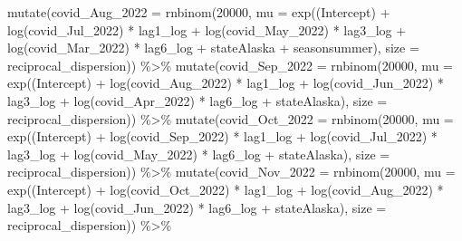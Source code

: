 \documentclass[
]{book}
\newenvironment{Shaded}{\begin{snugshade}}{\end{snugshade}}
\newcommand{\AttributeTok}[1]{\textcolor[rgb]{0.77,0.63,0.00}{#1}}
\newcommand{\DecValTok}[1]{\textcolor[rgb]{0.00,0.00,0.81}{#1}}
\newcommand{\FunctionTok}[1]{\textcolor[rgb]{0.00,0.00,0.00}{#1}}
\newcommand{\NormalTok}[1]{#1}
\newcommand{\SpecialCharTok}[1]{\textcolor[rgb]{0.00,0.00,0.00}{#1}}
\newcommand{\StringTok}[1]{\textcolor[rgb]{0.31,0.60,0.02}{#1}}
\begin{document}
\begin{Shaded}
\begin{Highlighting}[]
  \FunctionTok{mutate}\NormalTok{(}\AttributeTok{covid\_Aug\_2022 =} \FunctionTok{rnbinom}\NormalTok{(}\DecValTok{20000}\NormalTok{, }\AttributeTok{mu =} \FunctionTok{exp}\NormalTok{(}\StringTok{\textasciigrave{}}\AttributeTok{(Intercept)}\StringTok{\textasciigrave{}} \SpecialCharTok{+} \FunctionTok{log}\NormalTok{(covid\_Jul\_2022) }\SpecialCharTok{*}\NormalTok{ lag1\_log }\SpecialCharTok{+} \FunctionTok{log}\NormalTok{(covid\_May\_2022) }\SpecialCharTok{*}\NormalTok{ lag3\_log }\SpecialCharTok{+} \FunctionTok{log}\NormalTok{(covid\_Mar\_2022) }\SpecialCharTok{*}\NormalTok{ lag6\_log }\SpecialCharTok{+}\NormalTok{ stateAlaska }\SpecialCharTok{+}\NormalTok{ seasonsummer), }\AttributeTok{size =}\NormalTok{ reciprocal\_dispersion))  }\SpecialCharTok{\%\textgreater{}\%}
  \FunctionTok{mutate}\NormalTok{(}\AttributeTok{covid\_Sep\_2022 =} \FunctionTok{rnbinom}\NormalTok{(}\DecValTok{20000}\NormalTok{, }\AttributeTok{mu =} \FunctionTok{exp}\NormalTok{(}\StringTok{\textasciigrave{}}\AttributeTok{(Intercept)}\StringTok{\textasciigrave{}} \SpecialCharTok{+} \FunctionTok{log}\NormalTok{(covid\_Aug\_2022) }\SpecialCharTok{*}\NormalTok{ lag1\_log }\SpecialCharTok{+} \FunctionTok{log}\NormalTok{(covid\_Jun\_2022) }\SpecialCharTok{*}\NormalTok{ lag3\_log }\SpecialCharTok{+} \FunctionTok{log}\NormalTok{(covid\_Apr\_2022) }\SpecialCharTok{*}\NormalTok{ lag6\_log }\SpecialCharTok{+}\NormalTok{ stateAlaska), }\AttributeTok{size =}\NormalTok{ reciprocal\_dispersion)) }\SpecialCharTok{\%\textgreater{}\%}
  \FunctionTok{mutate}\NormalTok{(}\AttributeTok{covid\_Oct\_2022 =} \FunctionTok{rnbinom}\NormalTok{(}\DecValTok{20000}\NormalTok{, }\AttributeTok{mu =} \FunctionTok{exp}\NormalTok{(}\StringTok{\textasciigrave{}}\AttributeTok{(Intercept)}\StringTok{\textasciigrave{}} \SpecialCharTok{+} \FunctionTok{log}\NormalTok{(covid\_Sep\_2022) }\SpecialCharTok{*}\NormalTok{ lag1\_log }\SpecialCharTok{+} \FunctionTok{log}\NormalTok{(covid\_Jul\_2022) }\SpecialCharTok{*}\NormalTok{ lag3\_log }\SpecialCharTok{+} \FunctionTok{log}\NormalTok{(covid\_May\_2022) }\SpecialCharTok{*}\NormalTok{ lag6\_log }\SpecialCharTok{+}\NormalTok{ stateAlaska), }\AttributeTok{size =}\NormalTok{ reciprocal\_dispersion))  }\SpecialCharTok{\%\textgreater{}\%}
  \FunctionTok{mutate}\NormalTok{(}\AttributeTok{covid\_Nov\_2022 =} \FunctionTok{rnbinom}\NormalTok{(}\DecValTok{20000}\NormalTok{, }\AttributeTok{mu =} \FunctionTok{exp}\NormalTok{(}\StringTok{\textasciigrave{}}\AttributeTok{(Intercept)}\StringTok{\textasciigrave{}} \SpecialCharTok{+} \FunctionTok{log}\NormalTok{(covid\_Oct\_2022) }\SpecialCharTok{*}\NormalTok{ lag1\_log }\SpecialCharTok{+} \FunctionTok{log}\NormalTok{(covid\_Aug\_2022) }\SpecialCharTok{*}\NormalTok{ lag3\_log }\SpecialCharTok{+} \FunctionTok{log}\NormalTok{(covid\_Jun\_2022) }\SpecialCharTok{*}\NormalTok{ lag6\_log }\SpecialCharTok{+}\NormalTok{ stateAlaska), }\AttributeTok{size =}\NormalTok{ reciprocal\_dispersion))  }\SpecialCharTok{\%\textgreater{}\%}

\end{Highlighting}
\end{Shaded}
\end{document}
